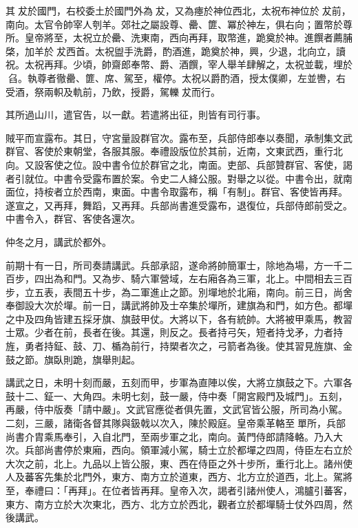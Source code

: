 \begin{pinyinscope}
 其犮於國門，右校委土於國門外為犮，又為瘞於神位西北，太祝布神位於犮前，南向。太官令帥宰人刳羊。郊社之屬設尊、罍、篚、冪於神左，俱右向；置幣於尊所。皇帝將至，太祝立於罍、洗東南，西向再拜，取幣進，跪奠於神。進饌者薦脯棨，加羊於犮西首。太祝盥手洗爵，酌酒進，跪奠於神，興，少退，北向立，讀祝。太祝再拜。少頃，帥齋郎奉幣、爵、酒饌，宰人舉羊肆解之，太祝並載，埋於臽。執尊者徹罍、篚、席、駕至，權停。太祝以爵酌酒，授太僕卿，左並轡，右受酒，祭兩軹及軌前，乃飲，授爵，駕轢犮而行。



 其所過山川，遣官告，以一獻。若遣將出征，則皆有司行事。



 賊平而宣露布。其日，守宮量設群官次。露布至，兵部侍郎奉以奏聞，承制集文武群官、客使於東朝堂，各服其服。奉禮設版位於其前，近南，文東武西，重行北向。又設客使之位。設中書令位於群官之北，南面。吏部、兵部贊群官、客使，謁者引就位。中書令受露布置於案。令史二人絳公服。對舉之以從。中書令出，就南面位，持桉者立於西南，東面。中書令取露布，稱「有制」。群官、客使皆再拜。遂宣之，又再拜，舞蹈，又再拜。兵部尚書進受露布，退復位，兵部侍郎前受之。中書令入，群官、客使各還次。



 仲冬之月，講武於都外。



 前期十有一日，所司奏請講武。兵部承詔，遂命將帥簡軍士，除地為場，方一千二百步，四出為和門。又為步、騎六軍營域，左右廂各為三軍，北上。中間相去三百步，立五表，表間五十步，為二軍進止之節。別墠地於北廂，南向。前三日，尚舍奉御設大次於墠。前一日，講武將帥及士卒集於墠所，建旗為和門，如方色。都墠之中及四角皆建五採牙旗、旗鼓甲仗。大將以下，各有統帥。大將被甲乘馬，教習士眾。少者在前，長者在後。其還，則反之。長者持弓矢，短者持戈矛，力者持旌，勇者持鉦、鼓、刀、楯為前行，持槊者次之，弓箭者為後。使其習見旌旗、金鼓之節。旗臥則跪，旗舉則起。



 講武之日，未明十刻而嚴，五刻而甲，步軍為直陣以俟，大將立旗鼓之下。六軍各鼓十二、鉦一、大角四。未明七刻，鼓一嚴，侍中奏「開宮殿門及城門」。五刻，再嚴，侍中版奏「請中嚴」。文武官應從者俱先置，文武官皆公服，所司為小駕。二刻，三嚴，諸衛各督其隊與鈒戟以次入，陳於殿庭。皇帝乘革輅至單所，兵部尚書介胄乘馬奉引，入自北門，至兩步軍之北，南向。黃門侍郎請降輅。乃入大次。兵部尚書停於東廂，西向。領軍減小駕，騎士立於都墠之四周，侍臣左右立於大次之前，北上。九品以上皆公服，東、西在侍臣之外十步所，重行北上。諸州使人及蕃客先集於北門外，東方、南方立於道東，西方、北方立於道西，北上。駕將至，奉禮曰：「再拜」。在位者皆再拜。皇帝入次，謁者引諸州使人，鴻臚引蕃客，東方、南方立於大次東北，西方、北方立於西北，觀者立於都墠騎士仗外四周，然後講武。




\end{pinyinscope}
